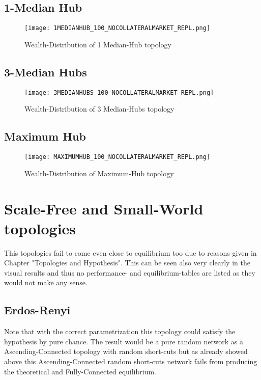 \documentclass[Bachelorarbeit.tex]{subfiles}
\begin{document}
\subsection{1-Median Hub}
\begin{figure}[H]
	\centering
  \texttt{[image: 1MEDIANHUB\_100\_NOCOLLATERALMARKET\_REPL.png]}
	\caption{Wealth-Distribution of 1 Median-Hub topology}
	\label{fig:wealth_1MEDIANHUB_100_NOCOLLATERALMARKET_REPL}
\end{figure}

\subsection{3-Median Hubs}
\begin{figure}[H]
	\centering
  \texttt{[image: 3MEDIANHUBS\_100\_NOCOLLATERALMARKET\_REPL.png]}
	\caption{Wealth-Distribution of 3 Median-Hubs topology}
	\label{fig:wealth_3MEDIANHUBS_100_NOCOLLATERALMARKET_REPL}
\end{figure}

\subsection{Maximum Hub}
\begin{figure}[H]
	\centering
  \texttt{[image: MAXIMUMHUB\_100\_NOCOLLATERALMARKET\_REPL.png]}
	\caption{Wealth-Distribution of Maximum-Hub topology}
	\label{fig:wealth_MAXIMUMHUB_100_NOCOLLATERALMARKET_REPL}
\end{figure}

\section{Scale-Free and Small-World topologies}
This topologies fail to come even close to equilibrium too due to reasons given in Chapter "Topologies and Hypothesis". This can be seen also very clearly in the visual results and thus no performance- and equilibrium-tables are listed as they would not make any sense.

\subsection{Erdos-Renyi}
Note that with the correct parametrization this topology could satisfy the hypothesis by pure chance. The result would be a pure random network as a Ascending-Connected topology with random short-cuts but as already showed above this Ascending-Connected random short-cuts network fails from producing the theoretical and Fully-Connected equilibrium.
\end{document}
